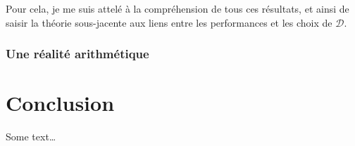 \documentclass[12pt, a4paper]{memoir}
\begin{document}
  Pour cela, je me suis attelé à la compréhension de tous ces résultats, et ainsi de saisir la théorie sous-jacente
  aux liens entre les performances et les choix de $\mathcal{D}$.
  
  \subsection{Une réalité arithmétique}
  
  
 
\chapter{Conclusion}
Some text\dots

\backmatter



%
\end{document}
